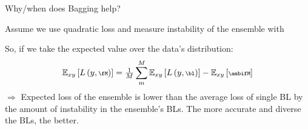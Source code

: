 \documentclass[11pt,compress,t,notes=noshow, xcolor=table]{beamer}
\begin{document}
\begin{vbframe}{Why/when does Bagging help?}



\small Assume we use quadratic loss and measure instability of the ensemble with
\vspace{-0.3cm}
So, if we take the expected value over the data's distribution:
$${\scriptsize \Exy\left[L\left(y, \fM\right)\right] = \tfrac{1}{M}\sum^M_{m} \Exy\left[L\left(y, \bl \right)\right] - \Exy\left[\ambifM\right]}$$
$\Rightarrow$ Expected loss of the ensemble is lower than the average loss of single BL by the amount of instability in the ensemble's BLs. The more accurate and diverse the BLs, the better.
\normalsize
\framebreak
\end{vbframe}
\end{document}

